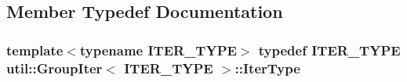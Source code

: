 \subsection{Member Typedef Documentation}
\hypertarget{structutil_1_1GroupIter_a69f8c8fcb507bd86932800705e59dfda}{
\subsubsection[{Iter\-Type}]{\setlength{\rightskip}{0pt plus 5cm}template$<$typename I\-T\-E\-R\-\_\-\-T\-Y\-P\-E$>$ typedef I\-T\-E\-R\-\_\-\-T\-Y\-P\-E {\bf util\-::\-Group\-Iter}$<$ I\-T\-E\-R\-\_\-\-T\-Y\-P\-E $>$\-::{\bf Iter\-Type}}}\label{structutil_1_1GroupIter_a69f8c8fcb507bd86932800705e59dfda}


